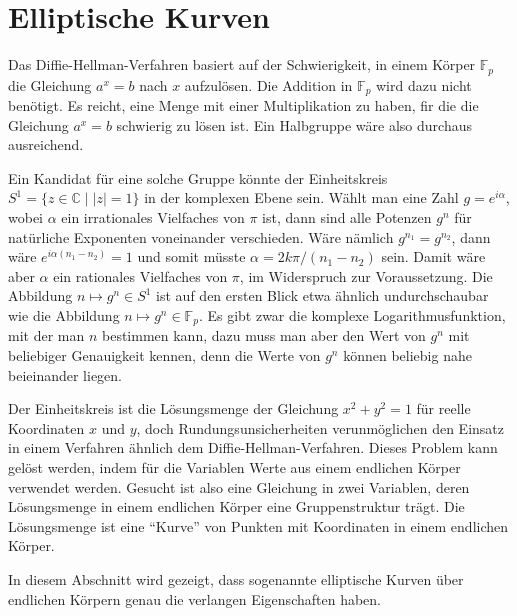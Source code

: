 %
%
%
\section{Elliptische Kurven
\label{buch:section:elliptische-kurven}}
%
Das Diffie-Hellman-Verfahren basiert auf der Schwierigkeit, in einem 
Körper $\mathbb{F}_p$ die Gleichung $a^x=b$ nach $x$ aufzulösen.
Die Addition in $\mathbb{F}_p$ wird dazu nicht benötigt.
Es reicht, eine Menge mit einer Multiplikation zu haben, fir die
die Gleichung $a^x=b$ schwierig zu lösen ist.
Ein Halbgruppe wäre also durchaus ausreichend.

Ein Kandidat für eine solche Gruppe könnte der Einheitskreis
$S^1=\{z\in\mathbb{C}\;|\; |z|=1\}$ in der komplexen Ebene sein.
Wählt man eine Zahl $g=e^{i\alpha}$, wobei $\alpha$ ein irrationales
Vielfaches von $\pi$ ist, dann sind alle Potenzen $g^n$ für natürliche
Exponenten voneinander verschieden.
Wäre nämlich $g^{n_1}=g^{n_2}$, dann wäre $e^{i\alpha(n_1-n_2)}=1$ und
somit müsste $\alpha=2k\pi/(n_1-n_2)$ sein.
Damit wäre aber $\alpha$ ein rationales Vielfaches von $\pi$, im Widerspruch
zur Voraussetzung.
Die Abbildung $n\mapsto g^n\in S^1$ ist auf den ersten Blick etwa ähnlich
undurchschaubar wie die Abbildung $n\mapsto g^n\in\mathbb{F}_p$.
Es gibt zwar die komplexe Logarithmusfunktion, mit der man $n$ bestimmen
kann, dazu muss man aber den Wert von $g^n$ mit beliebiger Genauigkeit
kennen, denn die Werte von $g^n$ können beliebig nahe beieinander liegen.

Der Einheitskreis ist die Lösungsmenge der Gleichung $x^2+y^2=1$ für
reelle Koordinaten $x$ und $y$,
doch Rundungsunsicherheiten verunmöglichen den Einsatz in einem 
Verfahren ähnlich dem Diffie-Hellman-Verfahren.
Dieses Problem kann gelöst werden, indem für die Variablen Werte
aus einem endlichen Körper verwendet werden.
Gesucht ist also eine Gleichung in zwei Variablen, deren Lösungsmenge
in einem endlichen Körper eine Gruppenstruktur trägt.
Die Lösungsmenge ist eine ``Kurve'' von Punkten mit
%
Koordinaten in einem endlichen Körper.

In diesem Abschnitt wird gezeigt, dass sogenannte elliptische Kurven
über endlichen Körpern genau die verlangen Eigenschaften haben.


